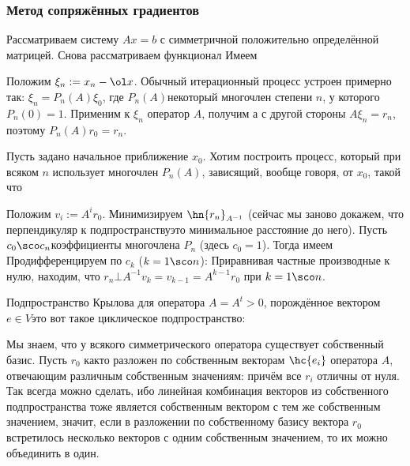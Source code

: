 \documentclass[a4paper]{article}
\begin{document}
\subsubsection{Метод сопряжённых градиентов}

Рассматриваем систему $Ax = b$ с симметричной положительно определённой матрицей.
Снова рассматриваем функционал
Имеем

Положим $\xi_n := x_n - \ol x$. Обычный итерационный процесс устроен примерно так:
$\xi_n = P_n(A)\xi_0$, где $P_n(A)$\т некоторый многочлен степени $n$, у которого $P_n(0) = 1$.
Применим к $\xi_n$ оператор $A$, получим
а с другой стороны $A\xi_n = r_n$, поэтому $P_n(A) r_0 = r_n$.

Пусть задано начальное приближение $x_0$. Хотим построить процесс,
который при всяком $n$ использует многочлен $P_n(A)$, зависящий, вообще говоря, от $x_0$,
такой что

Положим $v_i := A^i r_0$.
Минимизируем $\hn{r_n}_{A^{-1}}$ (сейчас мы заново докажем, что перпендикуляр к подпространству\т это минимальное расстояние до него).
Пусть $c_0\sco c_n$\т коэффициенты многочлена $P_n$ (здесь $c_0 = 1$).
Тогда имеем
Продифференцируем по $c_k$ ($k = 1\sco n$):
Приравнивая частные производные к нулю, находим, что $r_n \bot A^{-1} v_k = v_{k-1} = A^{k-1} r_0$ при $k = 1\sco n$.

\begin{df}
Подпространство Крылова для оператора $A = A^t > 0$, порождённое вектором $e \in V$\т это
вот такое циклическое подпространство:
\end{df}

Мы знаем, что у всякого симметрического оператора существует собственный базис.
Пусть $r_0$ как\д то разложен по собственным векторам $\hc{e_i}$ оператора $A$, отвечающим различным собственным значениям:
причём все $r_i$ отличны от нуля. Так всегда можно сделать, ибо линейная комбинация
векторов из собственного подпространства тоже является собственным вектором с тем же собственным значением,
значит, если в разложении по собственному базису вектора $r_0$ встретилось несколько векторов с одним собственным значением,
то их можно объединить в один.
\end{document}
